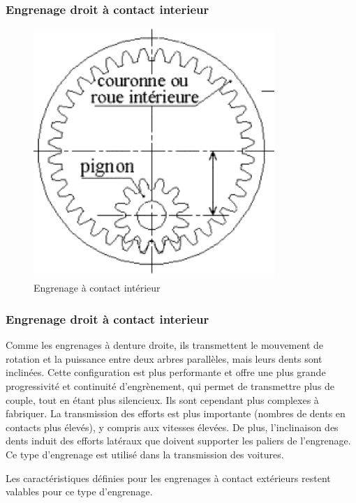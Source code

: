 \documentclass[10pt,fleqn]{article} %
\begin{document}
\begin{resultat}~
  \vspace{4cm}
\end{resultat}

\subsubsection{Engrenage droit à contact interieur}
\begin{figure}[h]
  \centering
  \includegraphics[width=.3\textwidth]{images/engre_interieur}
  \caption{Engrenage à contact intérieur}
  \label{}
\end{figure}
\begin{aretenir}
\end{aretenir}

\subsubsection{Engrenage droit à contact interieur}
Comme les engrenages à denture droite, ils transmettent le mouvement de rotation et la puissance entre deux arbres parallèles, mais leurs dents sont inclinées.
Cette configuration est plus performante et offre une plus grande progressivité et continuité d’engrènement, qui permet de transmettre plus de couple, tout en étant plus silencieux. Ils sont cependant plus complexes à fabriquer.
La transmission des efforts est plus importante (nombres de dents en contacts plus élevés), y compris aux vitesses élevées.
De plus, l’inclinaison des dents induit des efforts latéraux que doivent supporter les paliers de l’engrenage.
Ce type d’engrenage est utilisé dans la transmission des voitures.
\begin{warn}
  Les caractéristiques définies pour les engrenages à contact extérieurs restent valables pour ce type d’engrenage.
\end{warn}
\end{document}
